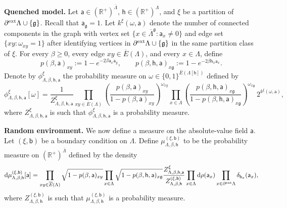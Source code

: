 \documentclass[11pt,a4paper]{article}
\numberwithin{equation}{section}
\theoremstyle{plain}
\theoremstyle{definition}
\newcommand\fg{\mathfrak{g}}
\begin{document}
\noindent \textbf{Quenched model.} Let $\mathsf a \in (\mathbb R^+)^{\overline \Lambda}$, $
\mathsf h \in (\mathbb R^+)^\Lambda$, and $\xi$ be a partition of $\partial^{\textup{ext}}\Lambda \cup \{ \mathfrak g\}$. Recall that $\mathsf{a}_\fg=1$. Let $k^\xi(\omega,\mathsf{a})$ denote the number of connected components in the graph with vertex set $\{x\in \overline\Lambda^\fg: \mathsf{a}_x\neq 0\}$ and edge set $\{xy: \omega_{xy}=1\}$ after identifying vertices in $\partial^{\textup{ext}}\Lambda\cup \{\fg\}$ in the same partition class of $\xi$.
For every $\beta \geq 0$, every edge $xy\in \overline E(\Lambda)$, and every $x\in \Lambda$, define 
\begin{equation}\label{eq:def p(beta,a)}
p(\beta, \mathsf a)_{xy}:=1-e^{-2\beta \mathsf a_x \mathsf a_y}, \qquad p(\beta, \mathsf h, \mathsf a)_{x\mathfrak g}:=1-e^{-2\beta \mathsf h_x \mathsf a_x}.
\end{equation}
Denote by $\phi^\xi_{\Lambda,\beta,\mathsf h, \mathsf a}$ the probability measure on $\omega\in \{0,1\}^{\overline E(\Lambda[\mathsf h])}$ defined by
\begin{equation} \label{def: random weight rc}
\phi^\xi_{\Lambda,\beta,\mathsf h, \mathsf a}[\omega]
=
\frac{1}{{Z}^{\xi}_{\Lambda,\beta,\mathsf h, \mathsf a}}\prod_{xy \in \overline E(\Lambda)} \left(\frac{p(\beta, \mathsf a)_{xy}}{1-p(\beta, \mathsf a)_{xy}}\right)^{\omega_{xy}} \prod_{x \in \Lambda} \left(\frac{p(\beta, \mathsf{h},\mathsf a)_{x\fg}}{1-p(\beta,\mathsf{h}, \mathsf a)_{x\fg}}\right)^{\omega_{x\fg}} \, 2^{k^\xi(\omega,\mathsf{a})},
\end{equation} 
where $Z^{\xi}_{\Lambda,\beta,\mathsf h, \mathsf a}$ is such that $\phi^\xi_{\Lambda,\beta,\mathsf{h},\mathsf{a}}$ is a probability measure. 

\hfill

\noindent\textbf{Random environment.} We now define a measure on the absolute-value field $\mathsf{a}$. Let $(\xi,\mathsf{b})$ be a boundary condition on $\Lambda$.
Define $\mu^{(\xi,\mathsf{b})}_{\Lambda, \beta, \mathsf h}$ to be the probability measure on $(\mathbb R^+)^{\overline \Lambda}$ defined by the density
\begin{equation} \label{def: annealed rc weight}
\mathrm{d} \mu^{(\xi,\mathsf{b})}_{\Lambda,\beta,\mathsf h}[\mathsf a] = 
\prod_{xy \in \overline E(\Lambda)} \sqrt{1-p(\beta,\mathsf a)_{xy}} \prod_{x \in \Lambda} \sqrt{1-p(\beta,\mathsf h, \mathsf a)_{x\mathfrak g}}\frac{Z^{\xi}_{\Lambda, \beta, \mathsf h, \mathsf a}}{Z^{(\xi,\mathsf{b})}_{\Lambda, \beta, \mathsf h}} \prod_{x \in \Lambda} \mathrm{d}\rho(\mathsf a_x) \prod_{x \in \partial^{\textup{ext}} \Lambda} \delta_{\mathsf{b}_x}(\mathsf{a}_x),
\end{equation}
where $Z^{(\xi,\mathsf{b})}_{\Lambda, \beta, \mathsf h}$ is such that $\mu_{\Lambda,\beta,\mathsf{h}}^{(\xi,\mathsf{b})}$ is a probability measure. 
\end{document}

